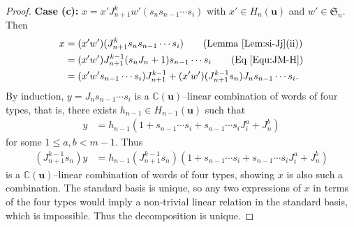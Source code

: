 \documentclass[a4paper, oneside]{amsart}
\numberwithin{equation}{section}
\theoremstyle{definition}
\theoremstyle{remark}
\begin{document}
\begin{proof}
\textbf{Case (c):} \(x = x'J_{n+1}^k w'(s_n s_{n-1} \cdots s_i)\) with \(x' \in H_n(\boldsymbol{u})\) and \(w' \in \mathfrak{S}_n\).  Then
\begin{align*}
x &= (x'w')(J_{n+1}^{k}s_n s_{n-1} \cdots s_i) \qquad \text{(Lemma~\ref{Lem:si-Jj}(ii))}\\
&= (x'w')J_{n+1}^{k-1}(s_n J_n + 1)s_{n-1} \cdots s_i\qquad  \text{(Eq~\eqref{Equ:JM-H})}\\
&= (x'w's_{n-1} \cdots s_i)J_{n+1}^{k-1} + (x'w')(J_{n+1}^{k-1}s_n)J_n s_{n-1} \cdots s_i.
\end{align*}
By induction, \(y = J_n s_{n-1} \cdots s_i\) is a $\mathbb{C}(\boldsymbol{u})$--linear combination of words of four types, that is, there exists \(h_{n-1} \in H_{n-1}(\boldsymbol{u})\) such that
\begin{align*}
 y&= h_{n-1}(1 + s_{n-1} \cdots s_i + s_{n-1} \cdots s_i J_i^a + J_n^b)
\end{align*}
for some $1\leq a,b<m-1$. Thus
\begin{align*}(J_{n+1}^{k-1} s_n)y &=  h_{n-1}(J_{n+1}^{k-1} s_n)(1 + s_{n-1} \cdots s_i + s_{n-1} \cdots s_i J_i^a + J_n^b)
\end{align*}
 is a $\mathbb{C}(\boldsymbol{u})$--linear combination of words of four types, showing \(x\) is also such a combination. The standard basis is unique, so any two expressions of $x$ in terms of the four types would imply a non-trivial linear relation in the standard basis, which is impossible. Thus the decomposition is unique.
\end{proof}
\end{document}
